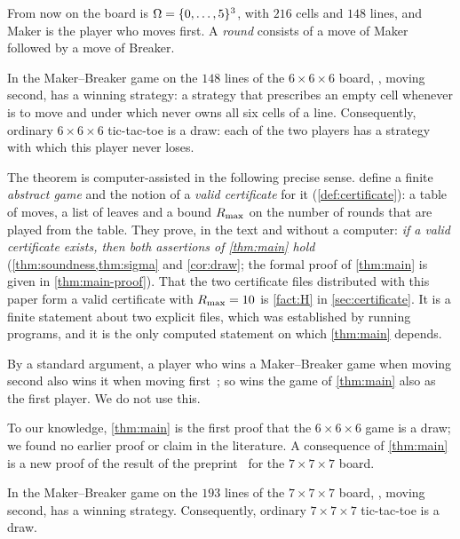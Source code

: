 From now on the board is $\Omega=\{0,\dots,5\}^3$, with $216$ cells and $148$ lines, and Maker is the
player who moves first. A \emph{round} consists of a move of Maker followed by a move of Breaker.

\begin{theorem}\label{thm:main}
In the Maker--Breaker game on the $148$ lines of the $6\times6\times6$ board, \Breaker, moving second,
has a winning strategy: a strategy that prescribes an empty cell whenever \Breaker{} is to move and under
which \Maker{} never owns all six cells of a line. Consequently, ordinary $6\times6\times6$ tic-tac-toe
is a draw: each of the two players has a strategy with which this player never loses.
\end{theorem}

The theorem is computer-assisted in the following precise sense. 
define a finite \emph{abstract game} and the notion of a \emph{valid certificate} for it
(\cref{def:certificate}): a table of moves, a list of leaves and a bound $R_{\max}$ on the number of rounds
that are played from the table. They prove, in the text and without a computer: \emph{if a valid certificate exists, then both
assertions of \cref{thm:main} hold} (\cref{thm:soundness,thm:sigma} and \cref{cor:draw}; the formal proof
of \cref{thm:main} is given in \cref{thm:main-proof}). That the two certificate files distributed with
this paper form a valid certificate with $R_{\max}=10$ is \cref{fact:H} in \cref{sec:certificate}. It is a
finite statement about two explicit files, which was established by running programs, and it is the only
computed statement on which \cref{thm:main} depends.

By a standard argument, a player who wins a Maker--Breaker game when moving second also wins it when
moving first~\cite{Krivelevich2014}; so \Breaker{} wins the game of \cref{thm:main} also as the first
player. We do not use this.

To our knowledge, \cref{thm:main} is the first proof that the $6\times6\times6$ game is a draw; we
found no earlier proof or claim in the literature. A consequence of \cref{thm:main} is a new proof of
the result of the preprint~\cite{CainRaymondKallersjo2025} for the $7\times7\times7$ board.

\begin{corollary}\label{cor:seven-intro}
In the Maker--Breaker game on the $193$ lines of the $7\times7\times7$ board, \Breaker, moving second,
has a winning strategy. Consequently, ordinary $7\times7\times7$ tic-tac-toe is a draw.
\end{corollary}

